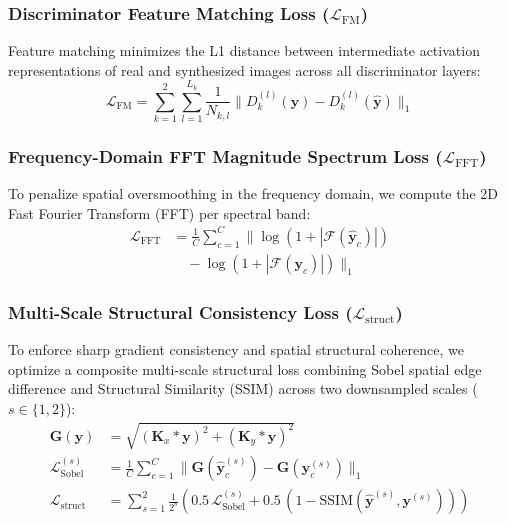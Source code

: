 \subsubsection{Discriminator Feature Matching Loss ($\mathcal{L}_{\text{FM}}$)}
Feature matching minimizes the L1 distance between intermediate activation representations of real and synthesized images across all discriminator layers:
\begin{equation}
    \mathcal{L}_{\text{FM}} = \sum_{k=1}^2 \sum_{l=1}^{L_k} \frac{1}{N_{k,l}} \|D_k^{(l)}(\mathbf{y}) - D_k^{(l)}(\hat{\mathbf{y}})\|_1
\end{equation}

\subsubsection{Frequency-Domain FFT Magnitude Spectrum Loss ($\mathcal{L}_{\text{FFT}}$)}
To penalize spatial oversmoothing in the frequency domain, we compute the 2D Fast Fourier Transform (FFT) per spectral band:
\begin{align}
    \mathcal{L}_{\text{FFT}} &= \frac{1}{C} \sum_{c=1}^C \Big\| \log\left(1 + |\mathcal{F}(\hat{\mathbf{y}}_c)|\right) \nonumber \\
    &\quad - \log\left(1 + |\mathcal{F}(\mathbf{y}_c)|\right) \Big\|_1
\end{align}

\subsubsection{Multi-Scale Structural Consistency Loss ($\mathcal{L}_{\text{struct}}$)}
To enforce sharp gradient consistency and spatial structural coherence, we optimize a composite multi-scale structural loss combining Sobel spatial edge difference and Structural Similarity (SSIM) across two downsampled scales ($s \in \{1, 2\}$):
\begin{align}
    \mathbf{G}(\mathbf{y}) &= \sqrt{(\mathbf{K}_x * \mathbf{y})^2 + (\mathbf{K}_y * \mathbf{y})^2} \\
    \mathcal{L}_{\text{Sobel}}^{(s)} &= \frac{1}{C} \sum_{c=1}^C \|\mathbf{G}(\hat{\mathbf{y}}_c^{(s)}) - \mathbf{G}(\mathbf{y}_c^{(s)})\|_1 \\
    \mathcal{L}_{\text{struct}} &= \sum_{s=1}^2 \frac{1}{2^s} \left( 0.5\,\mathcal{L}_{\text{Sobel}}^{(s)} + 0.5\,(1 - \text{SSIM}(\hat{\mathbf{y}}^{(s)}, \mathbf{y}^{(s)})) \right)
\end{align}

